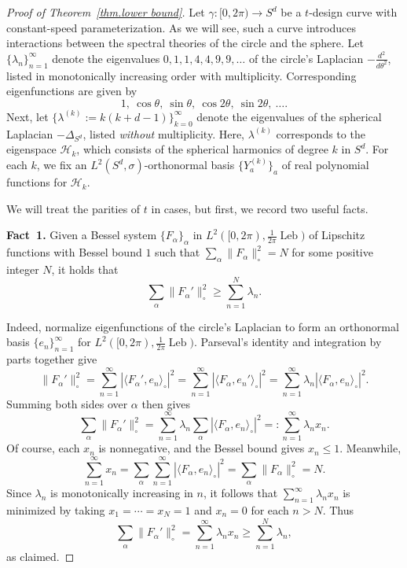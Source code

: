 \documentclass[12pt]{article}
\theoremstyle{plain}
\theoremstyle{definition}
\theoremstyle{remark}
\begin{document}
\begin{proof}[Proof of Theorem~\ref{thm.lower bound}]
Let $\gamma\colon[0,2\pi)\to S^d$ be a $t$-design curve with constant-speed parameterization.
As we will see, such a curve introduces interactions between the spectral theories of the circle and the sphere.
Let $\{\lambda_n\}_{n=1}^\infty$
denote the eigenvalues $0,1,1,4,4,9,9,\ldots$ of the circle's Laplacian
$-\frac{d^2}{d\theta^2}$, listed in monotonically increasing order with multiplicity.
Corresponding eigenfunctions are given by
\[
1,
~\cos\theta,
~\sin\theta,
~\cos2\theta,
~\sin2\theta,
~\ldots.
\]
Next, let $\{\lambda^{(k)}:=k(k+d-1)\}_{k=0}^\infty$ denote the eigenvalues of the spherical Laplacian $-\Delta_{S^d}$, listed \textit{without} multiplicity.
Here, $\lambda^{(k)}$ corresponds to the eigenspace $\mathcal{H}_k$, which consists of the spherical harmonics of degree $k$ in $S^d$.
For each $k$, we fix an $L^2(S^d,\sigma)$-orthonormal basis $\{Y^{(k)}_a\}_a$ of real polynomial functions for $\mathcal H_k$.

We will treat the parities of $t$ in cases, but first, we record two useful facts.

\medskip
\noindent
\textbf{Fact~1.}
Given a Bessel system $\{F_\alpha\}_\alpha$ in $L^2([0,2\pi),\frac{1}{2\pi}\operatorname{Leb})$ of Lipschitz functions with Bessel bound $1$ such that $\sum_\alpha \|F_\alpha\|_\circ^2=N$ for some positive integer $N$, it holds that
\[
\sum_\alpha \|F_\alpha'\|_\circ^2
\geq
\sum_{n=1}^N\lambda_n.
\]

Indeed, normalize eigenfunctions of the circle's Laplacian to form an orthonormal basis
$\{e_n\}_{n=1}^\infty$ for
$L^2([0,2\pi),\frac{1}{2\pi}\operatorname{Leb})$.
Parseval's identity and integration by parts together give
\[
\|F_\alpha'\|_\circ^2
=\sum_{n=1}^\infty |\langle F_\alpha',e_n\rangle_\circ|^2
=\sum_{n=1}^\infty |\langle F_\alpha,e_n'\rangle_\circ|^2
=\sum_{n=1}^\infty \lambda_n|\langle F_\alpha,e_n\rangle_\circ|^2.
\]
Summing both sides over $\alpha$ then gives
\[
\sum_\alpha \|F_\alpha'\|_\circ^2
=
\sum_{n=1}^\infty \lambda_n
\sum_\alpha |\langle F_\alpha,e_n\rangle_\circ|^2
=:
\sum_{n=1}^\infty \lambda_nx_n.
\]
Of course, each $x_n$ is nonnegative, and the Bessel bound gives
$x_n\leq 1$.
Meanwhile,
\[
\sum_{n=1}^\infty x_n
=
\sum_\alpha\sum_{n=1}^\infty |\langle F_\alpha,e_n\rangle_\circ|^2
=
\sum_\alpha\|F_\alpha\|_\circ^2
=
N.
\]
Since $\lambda_n$ is monotonically increasing in $n$, it follows that
$\sum_{n=1}^\infty\lambda_nx_n$ is minimized by taking
$x_1=\cdots=x_N=1$ and $x_n=0$ for each $n>N$.
Thus
\[
\sum_\alpha \|F_\alpha'\|_\circ^2
=
\sum_{n=1}^\infty \lambda_nx_n
\geq\sum_{n=1}^N\lambda_n,
\]
as claimed.


\end{proof}
\end{document}
